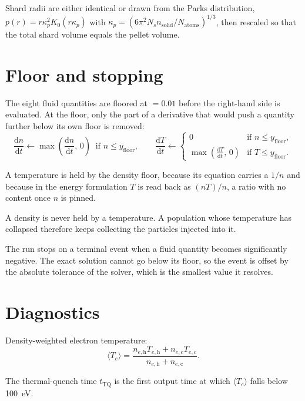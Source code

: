 \documentclass[11pt,a4paper]{article}
\newcommand{\dd}[2]{\frac{\mathrm{d}#1}{\mathrm{d}#2}}
\newcommand{\h}{\mathrm{h}}
\newcommand{\co}{\mathrm{c}}
\begin{document}
Shard radii are either identical or drawn from the Parks distribution,
$p(r) = r \kappa_p^2 K_0(r \kappa_p)$ with
$\kappa_p = \left(6\pi^2 N_s n_{\mathrm{solid}} / N_{\mathrm{atoms}}\right)^{1/3}$, then
rescaled so that the total shard volume equals the pellet volume.

\section{Floor and stopping}

The eight fluid quantities are floored at  $= 0.01$ before the right-hand
side is evaluated. At the floor, only the part of a derivative that would push a quantity
further below its own floor is removed:
\begin{equation}
  \dd{n}{t} \leftarrow \max\!\left(\dd{n}{t},\, 0\right) \ \text{ if } n \leq y_{\mathrm{floor}} ,
  \qquad
  \dd{T}{t} \leftarrow \begin{cases}
    0 & \text{if } n \leq y_{\mathrm{floor}} , \\[2pt]
    \max\!\left(\dd{T}{t},\, 0\right) & \text{if } T \leq y_{\mathrm{floor}} .
  \end{cases}
\end{equation}

A temperature is held by the density floor, because its equation carries a $1/n$ and because in
the energy formulation $T$ is read back as $(nT)/n$, a ratio with no content once $n$ is pinned.

A density is never held by a temperature. A population whose temperature has collapsed
therefore keeps collecting the particles injected into it.

The run stops on a terminal event when a fluid quantity becomes significantly negative. The
exact solution cannot go below its floor, so the event is offset by the absolute tolerance of
the solver, which is the smallest value it resolves.

\section{Diagnostics}

Density-weighted electron temperature:
\begin{equation}
  \langle T_e \rangle = \frac{n_{e,\h} T_{e,\h} + n_{e,\co} T_{e,\co}}{n_{e,\h} + n_{e,\co}} .
\end{equation}

The thermal-quench time $t_{\mathrm{TQ}}$ is the first output time at which
$\langle T_e \rangle$ falls below 100~eV.
\end{document}

